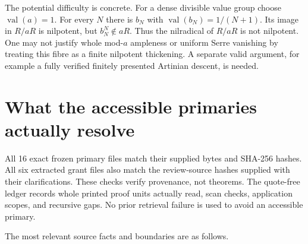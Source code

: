 \documentclass[
  11pt,
]{article}
\begin{document}
The potential difficulty is concrete. For a dense divisible value group
choose \(\operatorname{val}(a)=1\). For every \(N\) there is \(b_N\)
with \(\operatorname{val}(b_N)=1/(N+1)\). Its image in \(R/aR\) is
nilpotent, but \(b_N^N\notin aR\). Thus the nilradical of \(R/aR\) is
not nilpotent. One may not justify whole mod-\(a\) ampleness or uniform
Serre vanishing by treating this fibre as a finite nilpotent thickening.
A separate valid argument, for example a fully verified finitely
presented Artinian descent, is needed.

\section{What the accessible primaries actually
resolve}\label{what-the-accessible-primaries-actually-resolve}

All 16 exact frozen primary files match their supplied bytes and SHA-256
hashes. All six extracted grant files also match the review-source
hashes supplied with their clarifications. These checks verify
provenance, not theorems. The quote-free ledger records whole printed
proof units actually read, scan checks, application scopes, and
recursive gaps. No prior retrieval failure is used to avoid an
accessible primary.

The most relevant source facts and boundaries are as follows.
\end{document}
